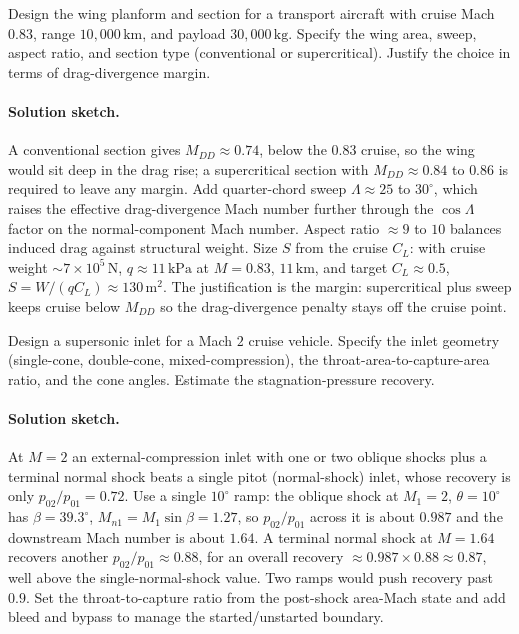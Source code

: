 \begin{exercise}
Design the wing planform and section for a transport aircraft
with cruise Mach $0.83$, range $10{,}000\,\si{\kilo\meter}$, and
payload $30{,}000\,\si{\kilogram}$. Specify the wing area,
sweep, aspect ratio, and section type (conventional or
supercritical). Justify the choice in terms of drag-divergence
margin.
\paragraph{Solution sketch.} A conventional section gives $M_{DD}
\approx 0.74$, below the $0.83$ cruise, so the wing would sit deep in
the drag rise; a supercritical section with $M_{DD} \approx 0.84$ to
$0.86$ is required to leave any margin. Add quarter-chord sweep
$\Lambda \approx 25$ to $30^{\circ}$, which raises the effective
drag-divergence Mach number further through the $\cos\Lambda$ factor
on the normal-component Mach number. Aspect ratio $\approx 9$ to $10$
balances induced drag against structural weight. Size $S$ from the
cruise $C_L$: with cruise weight $\sim 7\times 10^{5}\,\si{\newton}$,
$q \approx 11\,\text{kPa}$ at $M = 0.83$, $11\,\si{\kilo\meter}$, and
target $C_L \approx 0.5$, $S = W/(qC_L) \approx 130\,\si{\meter}^2$.
The justification is the margin: supercritical plus sweep keeps cruise
below $M_{DD}$ so the drag-divergence penalty stays off the cruise
point.
\end{exercise}

\begin{exercise}
Design a supersonic inlet for a Mach $2$ cruise vehicle. Specify
the inlet geometry (single-cone, double-cone, mixed-compression),
the throat-area-to-capture-area ratio, and the cone angles.
Estimate the stagnation-pressure recovery.
\paragraph{Solution sketch.} At $M = 2$ an external-compression inlet
with one or two oblique shocks plus a terminal normal shock beats a
single pitot (normal-shock) inlet, whose recovery is only $p_{02}/
p_{01} = 0.72$. Use a single $10^{\circ}$ ramp: the oblique shock at
$M_1 = 2$, $\theta = 10^{\circ}$ has $\beta = 39.3^{\circ}$, $M_{n1} =
M_1\sin\beta = 1.27$, so $p_{02}/p_{01}$ across it is about $0.987$ and
the downstream Mach number is about $1.64$. A terminal normal shock at
$M = 1.64$ recovers another $p_{02}/p_{01} \approx 0.88$, for an
overall recovery $\approx 0.987\times 0.88 \approx 0.87$, well above
the single-normal-shock value. Two ramps would push recovery past
$0.9$. Set the throat-to-capture ratio from the post-shock area-Mach
state and add bleed and bypass to manage the started/unstarted
boundary.
\end{exercise}

